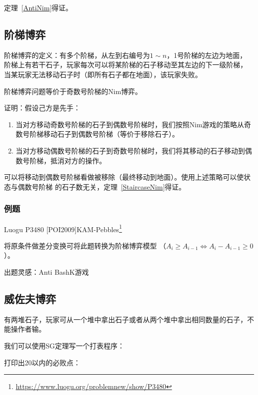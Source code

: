 定理~\ref{AntiNim}得证。

\subsection{阶梯博弈}
阶梯博弈的定义：有多个阶梯，从左到右编号为$1\sim n$，1号阶梯的左边为地面，
阶梯上有若干石子，玩家每次可以将某阶梯的石子移动至其左边的下一级阶梯，
当某玩家无法移动石子时（即所有石子都在地面），该玩家失败。

\begin{theorem}\label{StaircaseNim}
	阶梯博弈问题等价于奇数号阶梯的Nim博弈。
\end{theorem}

证明：假设己方是先手：

\begin{enumerate}
	\item 当对方移动奇数号阶梯的石子到偶数号阶梯时，我们按照Nim游戏的策略从奇
	      数号阶梯移动石子到偶数号阶梯（等价于移除石子）。
	\item 当对方移动偶数号阶梯的石子到奇数号阶梯时，我们将其移动的石子移动到偶
	      数号阶梯，抵消对方的操作。
\end{enumerate}

可以将移动到偶数号阶梯看做被移除（最终移动到地面）。使用上述策略可以使状态与偶数号阶梯
的石子数无关，定理~\ref{StaircaseNim}得证。

\subsubsection{例题}

Luogu P3480 [POI2009]KAM-Pebbles\footnote{
	\url{https://www.luogu.org/problemnew/show/P3480}
}

将原条件做差分变换可将此题转换为阶梯博弈模型
（$A_i \geq A_{i-1} \Leftrightarrow A_i-A_{i-1} \geq 0$）。



出题灵感：Anti BashK游戏

\subsection{威佐夫博弈}
有两堆石子，玩家可从一个堆中拿出石子或者从两个堆中拿出相同数量的石子，不能操作者输。

我们可以使用SG定理写一个打表程序：


打印出20以内的必败点：

